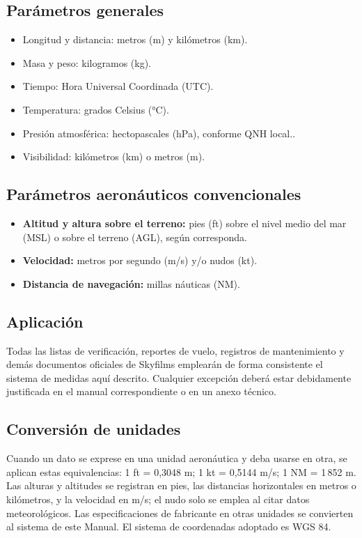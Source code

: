 \subsection*{Parámetros generales}
\begin{itemize}
    \item Longitud y distancia: metros (m) y kilómetros (km).  
    \item Masa y peso: kilogramos (kg).  
    \item Tiempo: Hora Universal Coordinada (UTC).  
    \item Temperatura: grados Celsius (°C).  
    \item Presión atmosférica: hectopascales (hPa), conforme QNH local..
    \item {Visibilidad:} kilómetros (km) o metros (m).
    
\end{itemize}

\subsection*{Parámetros aeronáuticos convencionales}
\begin{itemize}
    \item \textbf{Altitud y altura sobre el terreno:} pies (ft) sobre el nivel medio del mar (MSL) o sobre el terreno (AGL), según corresponda.  
    \item \textbf{Velocidad:} metros por segundo (m/s) y/o nudos (kt).  
    \item \textbf{Distancia de navegación:} millas náuticas (NM).  
\end{itemize}

\subsection*{Aplicación}
Todas las listas de verificación, reportes de vuelo, registros de mantenimiento y demás documentos oficiales de Skyfilms emplearán de forma consistente el sistema de medidas aquí descrito. Cualquier excepción deberá estar debidamente justificada en el manual correspondiente o en un anexo técnico.

\subsection*{Conversión de unidades}
Cuando un dato se exprese en una unidad aeronáutica y deba usarse en otra, se aplican estas equivalencias: 1 ft = 0,3048 m; 1 kt = 0,5144 m/s; 1 NM = 1\,852 m. Las alturas y altitudes se registran en pies, las distancias horizontales en metros o kilómetros, y la velocidad en m/s; el nudo solo se emplea al citar datos meteorológicos. Las especificaciones de fabricante en otras unidades se convierten al sistema de este Manual. El sistema de coordenadas adoptado es WGS 84.
